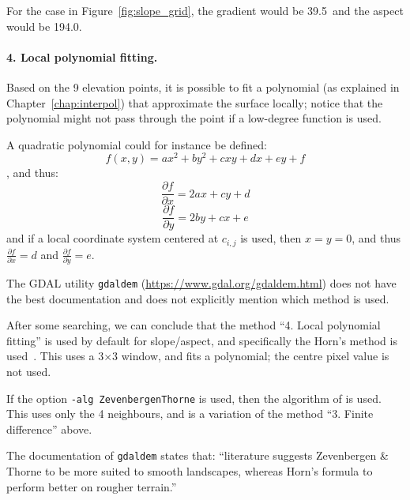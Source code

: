 For the case in Figure~\ref{fig:slope_grid}, the gradient would be 39.5\degree\ and the aspect would be 194.0\degree.


\paragraph{4. Local polynomial fitting.}%
\label{sec:polynomial}

Based on the 9 elevation points, it is possible to fit a polynomial (as explained in Chapter~\ref{chap:interpol}) that approximate the surface locally; notice that the polynomial might not pass through the point if a low-degree function is used.

A quadratic polynomial could for instance be defined:
\begin{equation}
  f(x,y) = ax^2 + by^2 + cxy + dx + ey + f
\end{equation}
, and thus:
\begin{equation}
  \frac{\partial f}{\partial x} = 2ax + cy + d
\end{equation}
\begin{equation}
  \frac{\partial f}{\partial y} = 2by + cx + e
\end{equation}
and if a local coordinate system centered at $c_{i,j}$ is used, then $x = y = 0$, and thus $\frac{\partial f}{\partial x} = d$ and $\frac{\partial f}{\partial y} = e$.


\begin{floatbox}
  \begin{kaobox-practice}[frametitle=\faCog\ How does it work in practice?]
    The GDAL utility \texttt{gdaldem} (\url{https://www.gdal.org/gdaldem.html}) does not have the best documentation and does not explicitly mention which method is used.

    After some searching, we can conclude that the method ``4. Local polynomial fitting'' is used by default for slope/aspect, and specifically the Horn's method is used~\citep{Horn81}.
    This uses a 3$\times$3 window, and fits a polynomial; the centre pixel value is not used.

    If the option \texttt{-alg ZevenbergenThorne} is used, then the algorithm of \citet{Zevenbergen87} is used. 
    This uses only the 4 neighbours, and is a variation of the method ``3. Finite difference'' above.

    The documentation of \texttt{gdaldem} states that: ``literature suggests Zevenbergen \& Thorne to be more suited to smooth landscapes, whereas Horn's formula to perform better on rougher terrain.''
  \end{kaobox-practice}
\end{floatbox}


